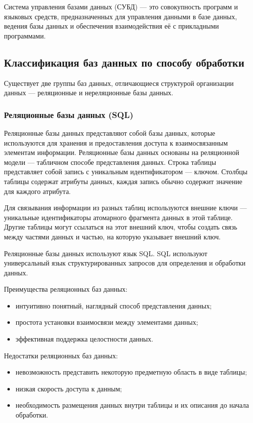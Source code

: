 Система управления базами данных (СУБД) --- это совокупность программ и языковых средств, предназначенных для управления данными в базе данных, ведения базы данных и обеспечения взаимодействия её с прикладными программами.

\subsection{Классификация баз данных по способу обработки}

Существует две группы баз данных, отличающиеся структурой организации данных --- реляционные и нереляционные базы данных.

\subsubsection{Реляционные базы данных (SQL)}

Реляционные базы данных представляют собой базы данных, которые используются для хранения и предоставления доступа к взаимосвязанным элементам информации. Реляционные базы данных основаны на реляционной модели --- табличном способе представления данных. Строка таблицы представляет собой запись с уникальным идентификатором --- ключом. Столбцы таблицы содержат атрибуты данных, каждая запись обычно содержит значение для каждого атрибута. 

Для связывания информации из разных таблиц используются внешние ключи --- уникальные идентификаторы атомарного фрагмента данных в этой таблице. Другие таблицы могут ссылаться на этот внешний ключ, чтобы создать связь между частями данных и частью, на которую указывает внешний ключ.

Реляционные базы данных используют язык SQL. SQL используют универсальный язык структурированных запросов для определения и обработки данных.

Преимущества реляционных баз данных:

\begin{itemize}
	\item интуитивно понятный, наглядный способ представления данных;
	\item простота установки взаимосвязи между элементами данных;
	\item эффективная поддержка целостности данных.
\end{itemize}

Недостатки реляционных баз данных:

\begin{itemize}
	\item невозможность представить некоторую предметную область в виде таблицы;
	\item низкая скорость доступа к данным;
	\item необходимость размещения данных внутри таблицы и их описания до начала обработки.
\end{itemize}

